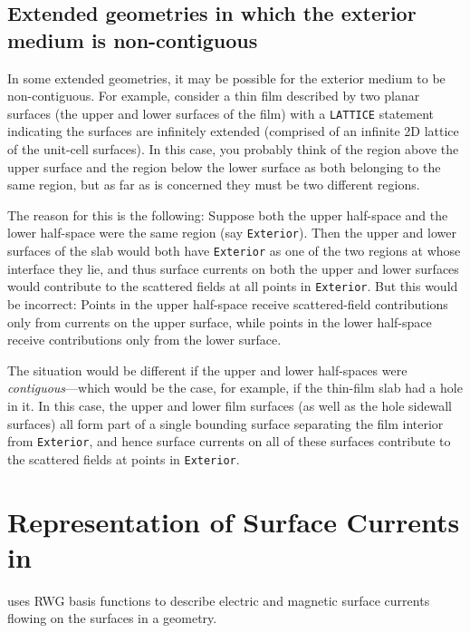 \documentclass[letterpaper]{article}
\begin{document}
\subsection*{Extended geometries in which the exterior medium
             is non-contiguous}

In some extended geometries, it may be possible for the 
exterior medium to be non-contiguous. For example,
consider a thin film described by two planar surfaces  
(the upper and lower surfaces of the film) with a
\texttt{LATTICE} statement indicating the surfaces
are infinitely extended (comprised of an infinite
2D lattice of the unit-cell surfaces).
In this case, you probably think of the region above the 
upper surface and the region below the lower surface as 
both belonging to the same region, but as far as 
\lss is concerned they must be two different regions.

The reason for this is the following: Suppose both
the upper half-space and the lower half-space were
the same region (say \texttt{Exterior}). Then the upper 
and lower surfaces of the slab would both have 
\texttt{Exterior} as one of the two regions 
at whose interface they lie, and thus surface currents
on both the upper and lower surfaces would contribute 
to the scattered fields at all points in \texttt{Exterior}.
But this would be incorrect: Points in the upper half-space
receive scattered-field contributions only from currents
on the upper surface, while points in the lower half-space 
receive contributions only from the lower surface. 

The situation would be different if the upper and lower 
half-spaces were \textit{contiguous}---which would be
the case, for example, if the thin-film slab had a hole
in it. In this case, the upper and lower film surfaces
(as well as the hole sidewall surfaces) all form 
part of a single bounding surface separating the 
film interior from \texttt{Exterior}, and hence surface
currents on all of these surfaces contribute to the
scattered fields at points in \texttt{Exterior}.

\newpage
\section{Representation of Surface Currents in \ls}

\lss uses RWG basis functions to describe electric and 
magnetic surface currents flowing on the surfaces in a 
geometry.
\end{document}
